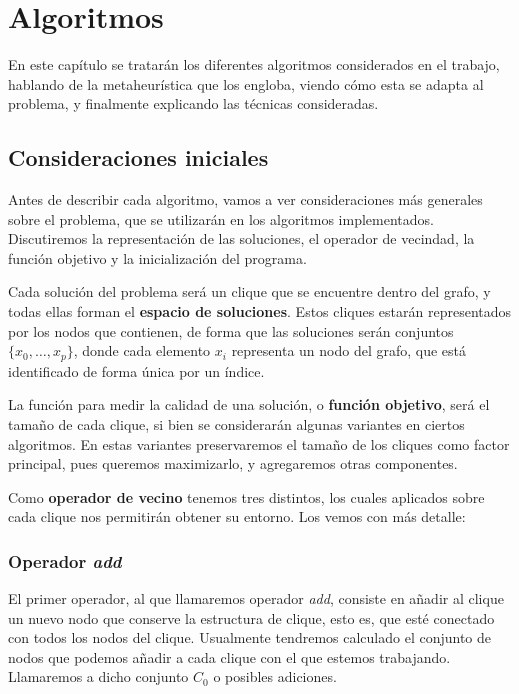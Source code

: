 \chapter{Algoritmos}\label{ch:algoritmos}

En este capítulo se tratarán los diferentes algoritmos considerados en el trabajo,
hablando de la metaheurística que los engloba, viendo cómo esta se adapta al
problema, y finalmente explicando las técnicas consideradas.

\section{Consideraciones iniciales}

Antes de describir cada algoritmo, vamos a ver consideraciones más generales sobre el problema, que
se utilizarán en los algoritmos implementados. Discutiremos la representación de las soluciones, el
operador de vecindad, la función objetivo y la inicialización del programa.

Cada solución del problema será un clique que se encuentre dentro del grafo, y todas ellas forman el
\textbf{espacio de soluciones}. Estos cliques estarán representados por los nodos que contienen,
de forma que las soluciones serán conjuntos $\{x_0, \dots, x_p\}$, donde cada elemento
$x_i$ representa un nodo del grafo, que está identificado de forma única por un índice.

La función para medir la calidad de una solución, o \textbf{función objetivo}, será
el tamaño de cada clique, si bien se considerarán algunas variantes en ciertos algoritmos.
En estas variantes preservaremos el tamaño de los cliques como factor principal,
pues queremos maximizarlo, y agregaremos otras componentes.

Como \textbf{operador de vecino} tenemos tres distintos, los cuales aplicados sobre
cada clique nos permitirán obtener su entorno. Los vemos con más detalle:

\subsection{Operador \textit{add}}

El primer operador, al que llamaremos operador \textit{add}, consiste en añadir al clique un
nuevo nodo que conserve la estructura de clique, esto es, que esté conectado con todos los
nodos del clique. Usualmente tendremos calculado el conjunto de nodos que podemos añadir
a cada clique con el que estemos trabajando. Llamaremos a dicho conjunto $C_0$ o posibles adiciones.

